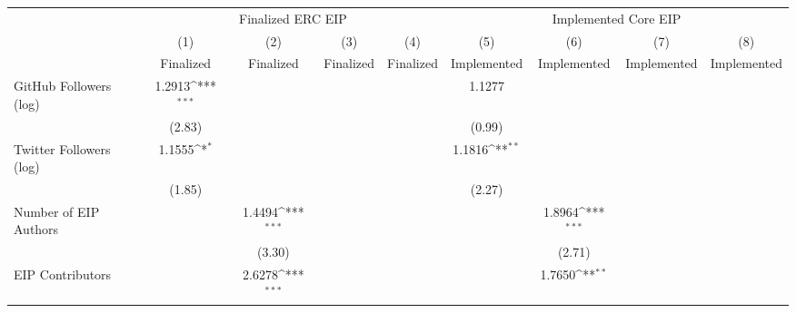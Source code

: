 {
\def\sym#1{\ifmmode^{#1}\else\(^{#1}\)\fi}
\begin{tabular}{l*{8}{c}}
\hline\hline
                                   &\multicolumn{4}{c}{Finalized ERC EIP}                                                  &\multicolumn{4}{c}{Implemented Core EIP}                                               \\\cmidrule(lr){2-5}\cmidrule(lr){6-9}
                                   &\multicolumn{1}{c}{(1)}         &\multicolumn{1}{c}{(2)}         &\multicolumn{1}{c}{(3)}         &\multicolumn{1}{c}{(4)}         &\multicolumn{1}{c}{(5)}         &\multicolumn{1}{c}{(6)}         &\multicolumn{1}{c}{(7)}         &\multicolumn{1}{c}{(8)}         \\
                                   &   Finalized         &   Finalized         &   Finalized         &   Finalized         & Implemented         & Implemented         & Implemented         & Implemented         \\
\hline
GitHub Followers (log)             &      1.2913\sym{***}&                     &                     &                     &      1.1277         &                     &                     &                     \\
                                   &      (2.83)         &                     &                     &                     &      (0.99)         &                     &                     &                     \\
[1em]
Twitter Followers (log)            &      1.1555\sym{*}  &                     &                     &                     &      1.1816\sym{**} &                     &                     &                     \\
                                   &      (1.85)         &                     &                     &                     &      (2.27)         &                     &                     &                     \\
[1em]
Number of EIP Authors              &                     &      1.4494\sym{***}&                     &                     &                     &      1.8964\sym{***}&                     &                     \\
                                   &                     &      (3.30)         &                     &                     &                     &      (2.71)         &                     &                     \\
[1em]
EIP Contributors                   &                     &      2.6278\sym{***}&                     &                     &                     &      1.7650\sym{**} &                     &                     \\

\end{tabular}}
